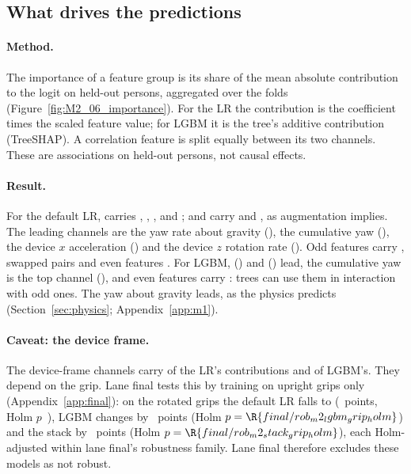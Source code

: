 \subsection{What drives the predictions}\label{app:m2:importance}

\paragraph{Method.} The importance of a feature group is its share of the mean absolute contribution to the
logit on held-out persons, aggregated over the folds (Figure~\ref{fig:M2_06_importance}). For the LR the
contribution is the coefficient times the scaled feature value; for LGBM it is the tree's additive contribution
(TreeSHAP). A correlation feature is split equally between its two channels. These are associations on
held-out persons, not causal effects.

\paragraph{Result.} For the default LR,  carries , 
,  ,  
and  ;  and  carry
 and , as augmentation implies. The leading channels are the yaw rate about gravity
(), the cumulative yaw (), the device $x$
acceleration () and the device $z$ rotation rate (). Odd
features carry , swapped pairs  and even features
. For LGBM,  () and 
() lead, the cumulative yaw is the top channel (), and even
features carry : trees can use them in interaction with odd ones. The yaw about
gravity leads, as the physics predicts (Section~\ref{sec:physics}; Appendix~\ref{app:m1}).

\paragraph{Caveat: the device frame.} The device-frame channels carry  of the
LR's contributions and  of LGBM's. They depend on the grip. Lane final tests this
by training on upright grips only (Appendix~\ref{app:final}): on the rotated grips the default LR falls to
 (~points, Holm $p$~), LGBM changes by
~points (Holm $p = \R{final/rob_m2_lgbm_grip_holm}$) and the stack by
~points (Holm $p = \R{final/rob_m2_stack_grip_holm}$), each Holm-adjusted within
lane final's robustness family. Lane final therefore excludes these models as not robust.

